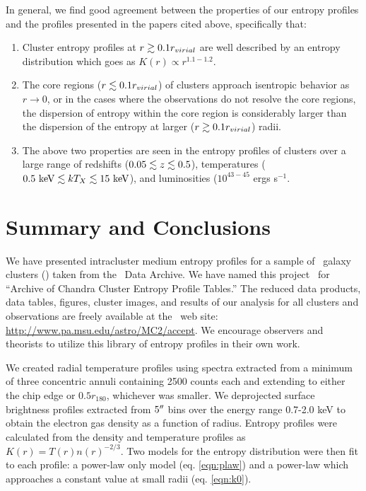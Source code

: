 \documentclass[12pt,preprint]{aastex}
\begin{document}
In general, we find good agreement between the properties of our
entropy profiles and the profiles presented in the papers cited above,
specifically that:
\begin{enumerate}
\item Cluster entropy profiles at $r \gtrsim 0.1 r_{virial}$ are well
  described by an entropy distribution which goes as $K(r) \propto
  r^{1.1-1.2}$.
\item The core regions ($r \lesssim 0.1 r_{virial}$) of clusters approach
  isentropic behavior as $r \rightarrow 0$, or in the cases where the
  observations do not resolve the core regions, the dispersion of
  entropy within the core region is considerably larger than the
  dispersion of the entropy at larger ($r \gtrsim 0.1 r_{virial}$) radii.
\item The above two properties are seen in the entropy profiles of
  clusters over a large range of redshifts ($0.05 \lesssim z \lesssim 0.5$),
  temperatures ($0.5 \mbox{\ensuremath{\mathrm{~keV}}} \lesssim kT_X \lesssim 15 \mbox{\ensuremath{\mathrm{~keV}}}$), and luminosities
  ($10^{43-45}$ ergs s$^{-1}$.
\end{enumerate}  

\section{Summary and Conclusions}
\label{sec:summary}

We have presented intracluster medium entropy profiles for a sample of
\numcluster\ galaxy clusters (\expt) taken from the \chandra\ Data
Archive. We have named this project \accept\ for ``Archive of Chandra
Cluster Entropy Profile Tables.'' The reduced data products, data
tables, figures, cluster images, and results of our analysis for all
clusters and observations are freely available at the \accept\ web
site: \url{http://www.pa.msu.edu/astro/MC2/accept}. We encourage
observers and theorists to utilize this library of entropy profiles in
their own work.

We created radial temperature profiles using spectra extracted from a
minimum of three concentric annuli containing 2500 counts each and
extending to either the chip edge or $0.5 r_{180}$, whichever was
smaller. We deprojected surface brightness profiles extracted from
$5\mathrm{^\prime}\hskip -0.1em\mathrm{^\prime}$ bins over the energy range 0.7-2.0 keV to obtain the electron
gas density as a function of radius. Entropy profiles were calculated
from the density and temperature profiles as $K(r) =
T(r)n(r)^{-2/3}$. Two models for the entropy distribution were then
fit to each profile: a power-law only model (eq. \ref{eqn:plaw}) and
a power-law which approaches a constant value at small radii
(eq. \ref{eqn:k0}).
\end{document}
